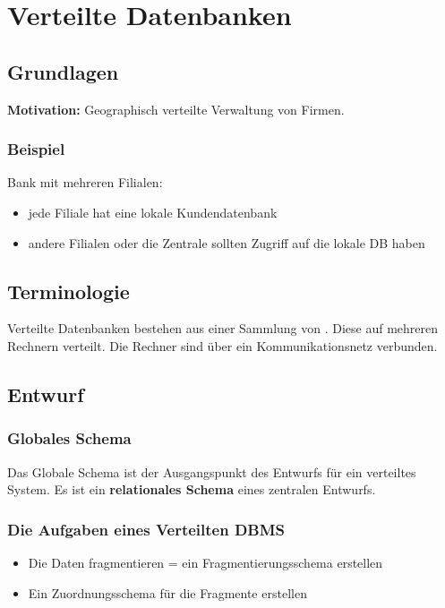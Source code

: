 \chapter{Verteilte Datenbanken}\label{cha:verteiltedb}

\section{Grundlagen}

\textbf{Motivation: } Geographisch verteilte Verwaltung von Firmen.

\subsection{Beispiel}

Bank mit mehreren Filialen:
\begin{itemize}
    \item jede Filiale hat eine lokale Kundendatenbank
    \item andere Filialen oder die Zentrale sollten Zugriff auf die lokale DB haben
\end{itemize}

\section{Terminologie}

Verteilte Datenbanken bestehen aus einer Sammlung von . Diese auf mehreren Rechnern verteilt. Die Rechner sind über ein Kommunikationsnetz verbunden.

\section{Entwurf}

\subsection{Globales Schema}

Das Globale Schema ist der Ausgangspunkt des Entwurfs für ein verteiltes System. Es ist ein \textbf{relationales Schema} eines zentralen Entwurfs.

\subsection{Die Aufgaben eines Verteilten DBMS}

\begin{itemize}
    \item Die Daten fragmentieren = ein Fragmentierungsschema erstellen
    \item Ein Zuordnungsschema für die Fragmente erstellen
\end{itemize}

